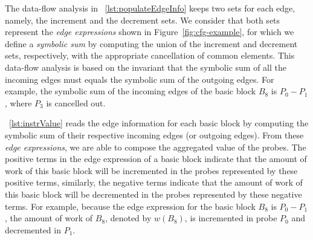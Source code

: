 The data-flow analysis in \lstlistingname~\ref{lst:populateEdgeInfo} keeps two sets for each edge, namely, the increment and the decrement sets.
We consider that both sets represent the \textit{edge expressions} shown in Figure~\ref{fig:cfg-example}, for which we define a \textit{symbolic sum} by computing the union of the increment and decrement sets, respectively, with the appropriate cancellation of common elements.
This data-flow analysis is based on the invariant that the symbolic sum of all the incoming edges must equals the symbolic sum of the outgoing edges.
For example, the symbolic sum of the incoming edges of the basic block $B_8$ is $P_0 - P_1$, where $P_3$ is cancelled out.


\lstlistingname~\ref{lst:instrValue} reads the edge information for each basic block by computing the symbolic sum of their respective incoming edges (or outgoing edges).
From these \textit{edge expressions}, we are able to compose the aggregated value of the probes.
The positive terms in the edge expression of a basic block indicate that the amount of work of this basic block will be incremented in the probes represented by these positive terms, similarly, the negative terms indicate that the amount of work of this basic block will be decremented in the probes represented by these negative terms.
For example, because the edge expression for the basic block $B_8$ is $P_0 - P_1$, the amount of work of $B_8$, denoted by $w(B_8)$, is incremented in probe $P_0$ and decremented in $P_1$.

